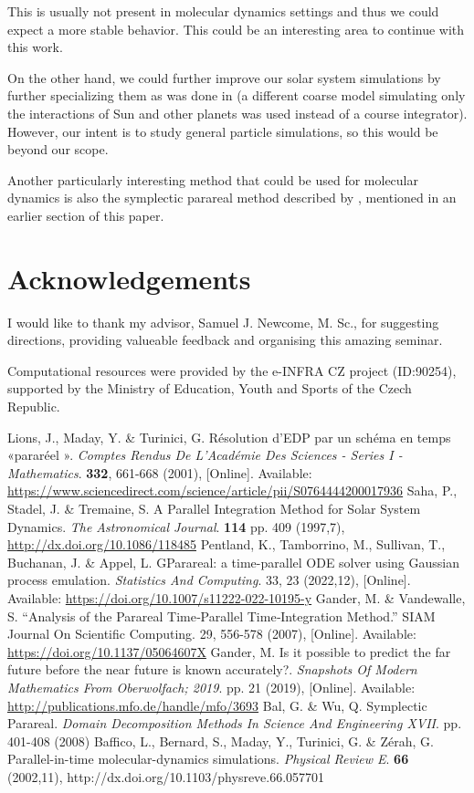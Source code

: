 \documentclass[conference]{IEEEtran}
\begin{document}
This is usually not present in molecular dynamics settings and thus we could expect a more stable behavior. This could be an interesting area to continue with this work.

On the other hand, we could further improve our solar system simulations by further specializing them as was done in \cite{parallelsolar} (a different coarse model simulating only the interactions of Sun and other planets was used instead of a course integrator). However, our intent is to study general particle simulations, so this would be beyond our scope.

Another particularly interesting method that could be used for molecular dynamics is also the symplectic parareal method described by \cite{symplecticparareal}, mentioned in an earlier section of this paper.

\section*{Acknowledgements}

I would like to thank my advisor, Samuel J. Newcome, M. Sc., for suggesting directions, providing valueable feedback and organising this amazing seminar.

Computational resources were provided by the e-INFRA CZ project (ID:90254),
supported by the Ministry of Education, Youth and Sports of the Czech Republic.

\begin{thebibliography}{00}
Lions, J., Maday, Y. \& Turinici, G. Résolution d'EDP par un schéma en temps «pararéel ». {\em Comptes Rendus De L'Académie Des Sciences - Series I - Mathematics}. \textbf{332}, 661-668 (2001), [Online]. Available: \url{https://www.sciencedirect.com/science/article/pii/S0764444200017936}
Saha, P., Stadel, J. \& Tremaine, S. A Parallel Integration Method for Solar System Dynamics. {\em The Astronomical Journal}. \textbf{114} pp. 409 (1997,7), \url{http://dx.doi.org/10.1086/118485}
Pentland, K., Tamborrino, M., Sullivan, T., Buchanan, J. \& Appel, L. GParareal: a time-parallel ODE solver using Gaussian process emulation. {\em Statistics And Computing}. 33, 23 (2022,12), [Online]. Available: \url{https://doi.org/10.1007/s11222-022-10195-y}
Gander, M. \& Vandewalle, S. ``Analysis of the Parareal Time‐Parallel Time‐Integration Method.'' SIAM Journal On Scientific Computing. 29, 556-578 (2007), [Online]. Available: \url{https://doi.org/10.1137/05064607X}
Gander, M. Is it possible to predict the far future before the near future is known accurately?. {\em Snapshots Of Modern Mathematics From Oberwolfach; 2019}. pp. 21 (2019), [Online]. Available: \url{http://publications.mfo.de/handle/mfo/3693}
Bal, G. \& Wu, Q. Symplectic Parareal. {\em Domain Decomposition Methods In Science And Engineering XVII}. pp. 401-408 (2008)
Baffico, L., Bernard, S., Maday, Y., Turinici, G. \& Zérah, G. Parallel-in-time molecular-dynamics simulations. {\em Physical Review E}. \textbf{66} (2002,11), http://dx.doi.org/10.1103/physreve.66.057701

\end{thebibliography}
\end{document}
